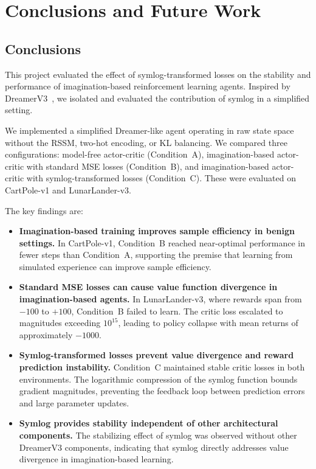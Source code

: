 \chapter{Conclusions and Future Work}
\label{ch:con}

\section{Conclusions}

This project evaluated the effect of symlog-transformed losses on the stability and performance of imagination-based reinforcement learning agents. Inspired by DreamerV3~\citep{hafner2023dreamerv3}, we isolated and evaluated the contribution of symlog in a simplified setting.

We implemented a simplified Dreamer-like agent operating in raw state space without the RSSM, two-hot encoding, or KL balancing. We compared three configurations: model-free actor-critic (Condition~A), imagination-based actor-critic with standard MSE losses (Condition~B), and imagination-based actor-critic with symlog-transformed losses (Condition~C). These were evaluated on CartPole-v1 and LunarLander-v3.

The key findings are:

\begin{itemize}
    \item \textbf{Imagination-based training improves sample efficiency in benign settings.} In CartPole-v1, Condition~B reached near-optimal performance in fewer steps than Condition~A, supporting the premise that learning from simulated experience can improve sample efficiency.

    \item \textbf{Standard MSE losses can cause value function divergence in imagination-based agents.} In LunarLander-v3, where rewards span from $-100$ to $+100$, Condition~B failed to learn. The critic loss escalated to magnitudes exceeding $10^{15}$, leading to policy collapse with mean returns of approximately $-1000$.

    \item \textbf{Symlog-transformed losses prevent value divergence and reward prediction instability.} Condition~C maintained stable critic losses in both environments. The logarithmic compression of the symlog function bounds gradient magnitudes, preventing the feedback loop between prediction errors and large parameter updates.

    \item \textbf{Symlog provides stability independent of other architectural components.} The stabilizing effect of symlog was observed without other DreamerV3 components, indicating that symlog directly addresses value divergence in imagination-based learning.
\end{itemize}

